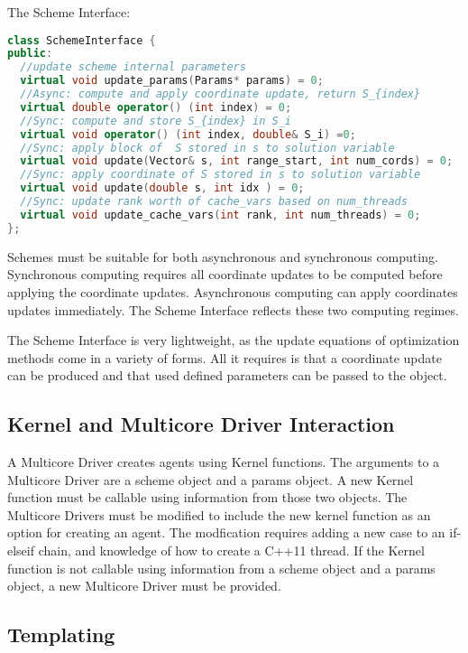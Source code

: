 The Scheme Interface:
\begin{lstlisting}[language=C++]
class SchemeInterface {
public:
  //update scheme internal parameters
  virtual void update_params(Params* params) = 0;
  //Async: compute and apply coordinate update, return S_{index}
  virtual double operator() (int index) = 0;
  //Sync: compute and store S_{index} in S_i
  virtual void operator() (int index, double& S_i) =0;
  //Sync: apply block of  S stored in s to solution variable
  virtual void update(Vector& s, int range_start, int num_cords) = 0;
  //Sync: apply coordinate of S stored in s to solution variable
  virtual void update(double s, int idx ) = 0;
  //Sync: update rank worth of cache_vars based on num_threads
  virtual void update_cache_vars(int rank, int num_threads) = 0;
};
\end{lstlisting}
Schemes must be suitable for both asynchronous and synchronous computing. Synchronous computing requires all coordinate updates to be computed before applying the coordinate updates. Asynchronous computing can apply coordinates updates immediately. The Scheme Interface reflects these two computing regimes.

The Scheme Interface is very lightweight, as the update equations of optimization methods come in a variety of forms.  All it requires is that a coordinate update can be produced and that used defined parameters can be passed to the object.

 


\subsection{Kernel and Multicore Driver Interaction}

A Multicore Driver creates agents using Kernel functions. The arguments to a Multicore Driver are a scheme object and a params object. A new Kernel function must be callable using information from those two objects. The Multicore Drivers must be modified to include the new kernel function as an option for creating an agent. The modfication requires adding a new case to an if-elseif chain, and knowledge of how to create a C++11 thread. If the Kernel function is not callable using information from a scheme object and a params object, a new Multicore Driver must be provided.

\subsection{Templating}

